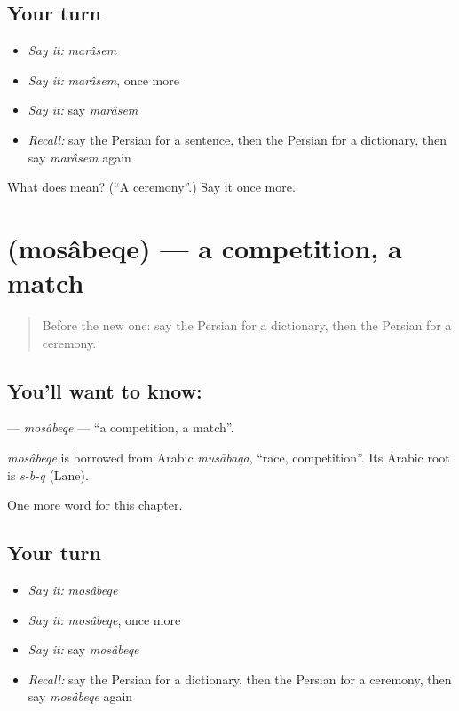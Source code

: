 \subsection*{Your turn}
\begin{itemize}
\raggedright
  \item \emph{Say it:} \emph{marâsem}
  \item \emph{Say it:} \emph{marâsem}, once more
  \item \emph{Say it:} say \emph{marâsem}
  \item \emph{Recall:} say the Persian for a sentence, then the Persian for a dictionary, then say \emph{marâsem} again
\end{itemize}

\begin{tcolorbox}[breakable,colback=teal!4,colframe=teal!35!black,title={Before you move on}]
What does  mean? (\textquotedblleft{}A ceremony\textquotedblright{}.) Say it once more.
\end{tcolorbox}
\section[\texorpdfstring{\fa{مسابقه} (mosâbeqe)}{مسابقه (mosâbeqe)}]{ (mosâbeqe) — a competition, a match}

\label{lesson:FA-C243-mosabeqe}



\begin{quote}
Before the new one: say the Persian for a dictionary, then the Persian for a ceremony.
\end{quote}

\subsection*{You'll want to know: }
\textbf{} — \emph{mosâbeqe} — \textquotedblleft{}a competition, a match\textquotedblright{}.

\begin{cousinweb}
\emph{mosâbeqe} is borrowed from Arabic \emph{musābaqa}, \textquotedblleft{}race, competition\textquotedblright{}. Its Arabic root is \emph{s-b-q} (Lane).
\end{cousinweb}

\begin{grammarlens}[title={What you've built}]
One more word for this chapter.
\end{grammarlens}

\subsection*{Your turn}
\begin{itemize}
\raggedright
  \item \emph{Say it:} \emph{mosâbeqe}
  \item \emph{Say it:} \emph{mosâbeqe}, once more
  \item \emph{Say it:} say \emph{mosâbeqe}
  \item \emph{Recall:} say the Persian for a dictionary, then the Persian for a ceremony, then say \emph{mosâbeqe} again
\end{itemize}

